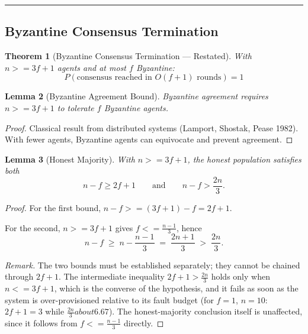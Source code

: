 \documentclass[
]{article}
\newtheorem{theorem}{Theorem}[section]
\newtheorem{lemma}[theorem]{Lemma}
\begin{document}
\begin{center}\rule{0.5\linewidth}{0.5pt}\end{center}

\subsection{Byzantine Consensus Termination}\label{sec:thm510-proof}

\begin{theorem}[Byzantine Consensus Termination --- Restated]
\label{thm:byzantine-restated}
With $n >= 3f + 1$ agents and at most $f$ Byzantine:
\begin{equation}
\label{eq:byzantine-restated}
P(\text{consensus reached in } O(f+1) \text{ rounds}) = 1
\end{equation}
\end{theorem}

\begin{lemma}[Byzantine Agreement Bound]
\label{lem:byzantine-bound}
Byzantine agreement requires $n >= 3f + 1$ to tolerate $f$ Byzantine agents.
\end{lemma}

\begin{proof}
Classical result from distributed systems (Lamport, Shostak, Pease 1982). With fewer agents, Byzantine agents can equivocate and prevent agreement.
\end{proof}

\begin{lemma}[Honest Majority]
\label{lem:honest-majority}
With $n >= 3f + 1$, the honest population satisfies both
\begin{equation}
\label{eq:honest-majority}
n - f \geq 2f + 1
\qquad\text{and}\qquad
n - f > \frac{2n}{3}.
\end{equation}
\end{lemma}

\begin{proof}
For the first bound, $n - f >= (3f + 1) - f = 2f + 1$.

For the second, $n >= 3f + 1$ gives $f <= \frac{n-1}{3}$, hence
\[
n - f \;\geq\; n - \frac{n-1}{3} \;=\; \frac{2n + 1}{3} \;>\; \frac{2n}{3}.
\]

\emph{Remark.} The two bounds must be established separately; they cannot be
chained through $2f + 1$. The intermediate inequality $2f + 1 > \frac{2n}{3}$
holds only when $n <= 3f + 1$, which is the converse of the hypothesis, and it
fails as soon as the system is over-provisioned relative to its fault budget
(for $f = 1$, $n = 10$: $2f + 1 = 3$ while $\frac{2n}{3} about 6.67$). The
honest-majority conclusion itself is unaffected, since it follows from
$f <= \frac{n-1}{3}$ directly.
\end{proof}
\end{document}
